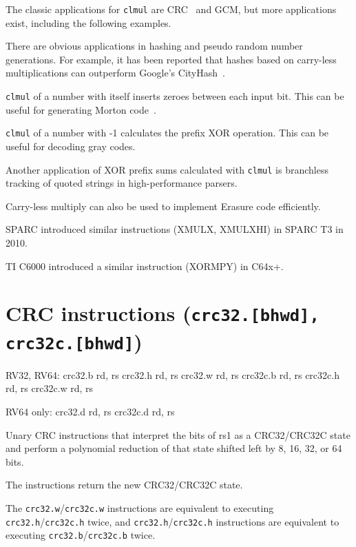 The classic applications for \texttt{clmul} are CRC~\cite{FastCRC,Wolf18A} and GCM, but more
applications exist, including the following examples.

There are obvious applications in hashing and pseudo random number generations. For
example, it has been reported that hashes based on carry-less multiplications can
outperform Google's CityHash~\cite{CLHASH}.

\texttt{clmul} of a number with itself inserts zeroes between each input bit. This can
be useful for generating Morton code~\cite{MortonCode}.

\texttt{clmul} of a number with -1 calculates the prefix XOR operation. This can
be useful for decoding gray codes.

Another application of XOR prefix sums calculated with \texttt{clmul} is
branchless tracking of quoted strings in high-performance parsers.~\cite{ParseJSON}

Carry-less multiply can also be used to implement Erasure code efficiently.~\cite{ClmulErasureCode}

SPARC introduced similar instructions (XMULX, XMULXHI) in SPARC T3 in 2010.~\cite{sparct3}

TI C6000 introduced a similar instruction (XORMPY) in C64x+.~\cite{c64xp}


\section{CRC instructions (\texttt{crc32.[bhwd], crc32c.[bhwd]})}

\begin{rvb}
  RV32, RV64:
    crc32.b rd, rs
    crc32.h rd, rs
    crc32.w rd, rs
    crc32c.b rd, rs
    crc32c.h rd, rs
    crc32c.w rd, rs

  RV64 only:
    crc32.d rd, rs
    crc32c.d rd, rs
\end{rvb}

Unary CRC instructions that interpret the bits of rs1 as a CRC32/CRC32C state
and perform a polynomial reduction of that state shifted left by 8, 16, 32, or
64 bits.

The instructions return the new CRC32/CRC32C state.

The \texttt{crc32.w}/\texttt{crc32c.w} instructions are equivalent to executing
\texttt{crc32.h}/\texttt{crc32c.h} twice, and \texttt{crc32.h}/\texttt{crc32c.h}
instructions are equivalent to executing \texttt{crc32.b}/\texttt{crc32c.b}
twice.

